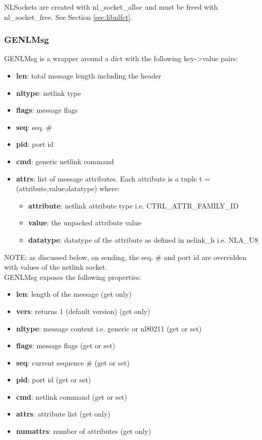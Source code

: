 \documentclass[11pt]{article}
\begin{document}
\begin{appendices}
NLSockets are created with nl\_socket\_alloc and must be freed with nl\_socket\_free.
See Section \ref{sec:libnlfct}.

\subsubsection{GENLMsg}
GENLMsg is a wrapper around a dict with the following key->value pairs:
\begin{itemize}
\item \textbf{len}: total message length including the header
\item \textbf{nltype}: netlink type
\item \textbf{flags}: message flags
\item \textbf{seq}: seq. \#
\item \textbf{pid}: port id
\item \textbf{cmd}: generic netlink command
\item \textbf{attrs}: list of message attributes. Each attribute is a tuple t =
(attribute,value,datatype) where:
\begin{itemize}
\item \textbf{attribute}: netlink attribute type i.e. CTRL\_ATTR\_FAMILY\_ID
\item \textbf{value}: the unpacked attribute value
\item \textbf{datatype}: datatype of the attribute as defined in nelink\_h i.e.
NLA\_U8
\end{itemize}
\end{itemize}
NOTE: as discussed below, on sending, the seq. \# and port id are overridden with
values of the netlink socket.\\

GENLMsg exposes the following properties:
\begin{itemize}
\item \textbf{len}: length of the message (get only)
\item \textbf{vers}: returns 1 (default version) (get only)
\item \textbf{nltype}: message content i.e. generic or nl80211 (get or set)
\item \textbf{flags}: message flags (get or set)
\item \textbf{seq}: current sequence \# (get or set)
\item \textbf{pid}: port id (get or set)
\item \textbf{cmd}: netlink command (get or set)
\item \textbf{attrs}: attribute list (get only)
\item \textbf{numattrs}: number of attributes (get only)
\end{itemize}


\end{appendices}
\end{document}
